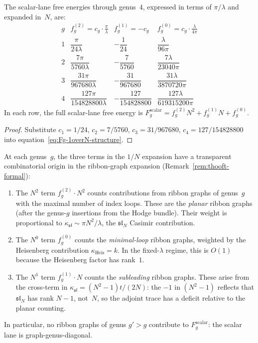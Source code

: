 \begin{computation}
\label{comp:gl-n-free-energy-table}
The scalar-lane free energies through genus~$4$, expressed
in terms of $\pi/\lambda$ and expanded in~$N$, are:
\[
\renewcommand{\arraystretch}{1.7}
\begin{array}{c|c|c|c}
g & f_g^{(2)} = c_g \cdot \frac{\pi}{\lambda}
 & f_g^{(1)} = -c_g
 & f_g^{(0)} = c_g \cdot \frac{\lambda}{4\pi} \\
\hline
1 & \dfrac{\pi}{24\lambda}
 & -\dfrac{1}{24}
 & \dfrac{\lambda}{96\pi} \\[6pt]
2 & \dfrac{7\pi}{5760\lambda}
 & -\dfrac{7}{5760}
 & \dfrac{7\lambda}{23040\pi} \\[6pt]
3 & \dfrac{31\pi}{967680\lambda}
 & -\dfrac{31}{967680}
 & \dfrac{31\lambda}{3870720\pi} \\[6pt]
4 & \dfrac{127\pi}{154828800\lambda}
 & -\dfrac{127}{154828800}
 & \dfrac{127\lambda}{619315200\pi}
\end{array}
\]
In each row, the full scalar-lane free energy is
$F_g^{\mathrm{scalar}} = f_g^{(2)} N^2 + f_g^{(1)} N + f_g^{(0)}$.
\end{computation}

\begin{proof}
Substitute $c_1 = 1/24$, $c_2 = 7/5760$, $c_3 = 31/967680$,
$c_4 = 127/154828800$ into
equation~\eqref{eq:Fg-1overN-structure}.
\end{proof}

\begin{remark}
\label{rem:feynman-diagram-interpretation}
At each genus~$g$, the three terms in the $1/N$ expansion have a
transparent combinatorial origin in the ribbon-graph expansion
(Remark~\ref{rem:thooft-formal}):
\begin{enumerate}[label=\textup{(\alph*)}]
\item The $N^2$ term $f_g^{(2)} \cdot N^2$ counts contributions from
 ribbon graphs of genus~$g$ with the maximal number of index loops.
 These are the \emph{planar} ribbon graphs (after the genus-$g$
 insertions from the Hodge bundle). Their weight is proportional to
 $\kappa_{\mathfrak{sl}} \sim \pi N^2/\lambda$, the
 $\mathfrak{sl}_N$ Casimir contribution.
\item The $N^0$ term $f_g^{(0)}$ counts the \emph{minimal-loop}
 ribbon graphs, weighted by the Heisenberg contribution
 $\kappa_{\mathrm{Heis}} = k$. In the fixed-$\lambda$ regime,
 this is $O(1)$ because the Heisenberg factor has rank~$1$.
\item The $N^1$ term $f_g^{(1)} \cdot N$ counts the \emph{subleading}
 ribbon graphs. These arise from the cross-term in
 $\kappa_{\mathfrak{sl}} = (N^2-1)t/(2N)$: the $-1$ in $(N^2-1)$
 reflects that $\mathfrak{sl}_N$ has rank $N-1$, not~$N$, so the
 adjoint trace has a deficit relative to the planar counting.
\end{enumerate}
In particular, no ribbon graphs of genus $g' > g$ contribute to
$F_g^{\mathrm{scalar}}$: the scalar lane is graph-genus-diagonal.
\end{remark}

